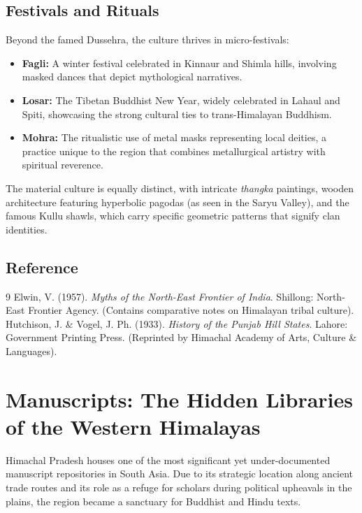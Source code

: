 \documentclass[12pt]{article}
\begin{document}
\subsection{Festivals and Rituals}
Beyond the famed Dussehra, the culture thrives in micro-festivals:
\begin{itemize}
    \item \textbf{Fagli:} A winter festival celebrated in Kinnaur and Shimla hills, involving masked dances that depict mythological narratives.
    \item \textbf{Losar:} The Tibetan Buddhist New Year, widely celebrated in Lahaul and Spiti, showcasing the strong cultural ties to trans-Himalayan Buddhism.
    \item \textbf{Mohra:} The ritualistic use of metal masks representing local deities, a practice unique to the region that combines metallurgical artistry with spiritual reverence.
\end{itemize}

The material culture is equally distinct, with intricate \textit{thangka} paintings, wooden architecture featuring hyperbolic pagodas (as seen in the Saryu Valley), and the famous Kullu shawls, which carry specific geometric patterns that signify clan identities.

\subsection{Reference}
\begin{thebibliography}{9}
 Elwin, V. (1957). \textit{Myths of the North-East Frontier of India}. Shillong: North-East Frontier Agency. (Contains comparative notes on Himalayan tribal culture).
 Hutchison, J. \& Vogel, J. Ph. (1933). \textit{History of the Punjab Hill States}. Lahore: Government Printing Press. (Reprinted by Himachal Academy of Arts, Culture \& Languages).
\end{thebibliography}

\section{Manuscripts: The Hidden Libraries of the Western Himalayas}
Himachal Pradesh houses one of the most significant yet under-documented manuscript repositories in South Asia. Due to its strategic location along ancient trade routes and its role as a refuge for scholars during political upheavals in the plains, the region became a sanctuary for Buddhist and Hindu texts.
\end{document}

